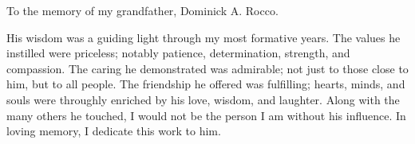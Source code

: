 To the memory of my grandfather, Dominick A. Rocco.

His wisdom was a guiding light through my most formative years.
The values he instilled were priceless; notably
patience, determination, strength, and compassion.
The caring he demonstrated was admirable; not just to those close to him,
but to all people.
The friendship he offered was fulfilling; hearts, minds, and souls
were throughly enriched by his love, wisdom, and laughter.
Along with the many others he touched, I would not be the person
I am without his influence.
In loving memory, I dedicate this work to him.
